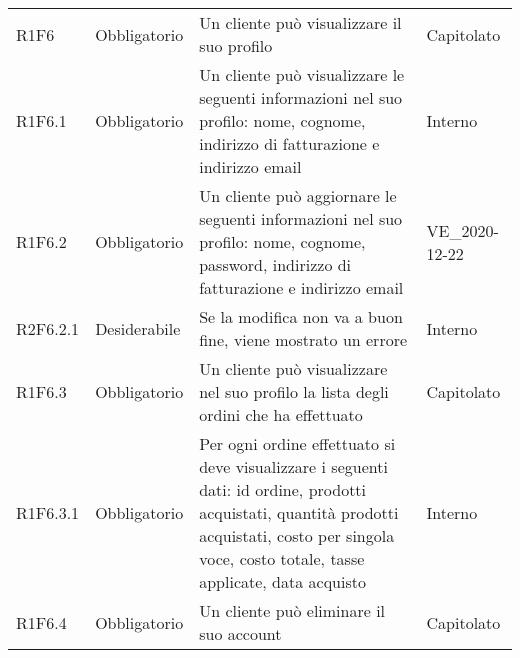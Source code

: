 {\begin{longtable}{C{2.5cm} C{2.8cm} C{6.7cm} C{2.5cm}}

R1F6 & Obbligatorio & Un cliente può visualizzare il suo profilo & Capitolato \\
R1F6.1 & Obbligatorio & Un cliente può visualizzare le seguenti informazioni nel suo profilo: nome, cognome, indirizzo di fatturazione e indirizzo email & Interno \\
R1F6.2 & Obbligatorio & Un cliente può aggiornare le seguenti informazioni nel suo profilo: nome, cognome, password, indirizzo di fatturazione e indirizzo email & VE\_2020-12-22 \\
R2F6.2.1 & Desiderabile & Se la modifica non va a buon fine, viene mostrato un errore & Interno \\
R1F6.3 & Obbligatorio & Un cliente può visualizzare nel suo profilo la lista degli ordini che ha effettuato & Capitolato \\
R1F6.3.1 & Obbligatorio & Per ogni ordine effettuato si deve visualizzare i seguenti dati: id ordine, prodotti acquistati, quantità prodotti acquistati, costo per singola voce, costo totale, tasse applicate, data acquisto & Interno \\
R1F6.4 & Obbligatorio & Un cliente può eliminare il suo account & Capitolato \\



\end{longtable}}
